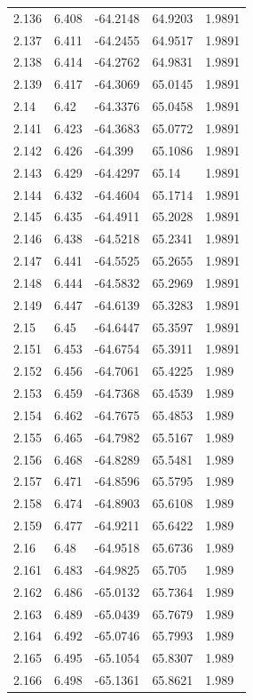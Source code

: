 \begin{tabular}{lllll}
2.136 & 6.408 & -64.2148 & 64.9203 & 1.9891 \\
2.137 & 6.411 & -64.2455 & 64.9517 & 1.9891 \\
2.138 & 6.414 & -64.2762 & 64.9831 & 1.9891 \\
2.139 & 6.417 & -64.3069 & 65.0145 & 1.9891 \\
2.14 & 6.42 & -64.3376 & 65.0458 & 1.9891 \\
2.141 & 6.423 & -64.3683 & 65.0772 & 1.9891 \\
2.142 & 6.426 & -64.399 & 65.1086 & 1.9891 \\
2.143 & 6.429 & -64.4297 & 65.14 & 1.9891 \\
2.144 & 6.432 & -64.4604 & 65.1714 & 1.9891 \\
2.145 & 6.435 & -64.4911 & 65.2028 & 1.9891 \\
2.146 & 6.438 & -64.5218 & 65.2341 & 1.9891 \\
2.147 & 6.441 & -64.5525 & 65.2655 & 1.9891 \\
2.148 & 6.444 & -64.5832 & 65.2969 & 1.9891 \\
2.149 & 6.447 & -64.6139 & 65.3283 & 1.9891 \\
2.15 & 6.45 & -64.6447 & 65.3597 & 1.9891 \\
2.151 & 6.453 & -64.6754 & 65.3911 & 1.9891 \\
2.152 & 6.456 & -64.7061 & 65.4225 & 1.989 \\
2.153 & 6.459 & -64.7368 & 65.4539 & 1.989 \\
2.154 & 6.462 & -64.7675 & 65.4853 & 1.989 \\
2.155 & 6.465 & -64.7982 & 65.5167 & 1.989 \\
2.156 & 6.468 & -64.8289 & 65.5481 & 1.989 \\
2.157 & 6.471 & -64.8596 & 65.5795 & 1.989 \\
2.158 & 6.474 & -64.8903 & 65.6108 & 1.989 \\
2.159 & 6.477 & -64.9211 & 65.6422 & 1.989 \\
2.16 & 6.48 & -64.9518 & 65.6736 & 1.989 \\
2.161 & 6.483 & -64.9825 & 65.705 & 1.989 \\
2.162 & 6.486 & -65.0132 & 65.7364 & 1.989 \\
2.163 & 6.489 & -65.0439 & 65.7679 & 1.989 \\
2.164 & 6.492 & -65.0746 & 65.7993 & 1.989 \\
2.165 & 6.495 & -65.1054 & 65.8307 & 1.989 \\
2.166 & 6.498 & -65.1361 & 65.8621 & 1.989 \\

\end{tabular}
